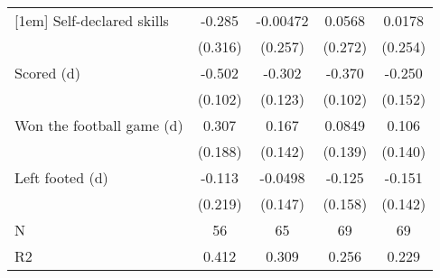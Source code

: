 {\begin{tabular}{l*{4}{c}}
[1em]
Self-declared skills&      -0.285         &    -0.00472         &      0.0568         &      0.0178         \\
                    &     (0.316)         &     (0.257)         &     (0.272)         &     (0.254)         \\
[1em]
Scored (d)          &      -0.502\sym{***}&      -0.302\sym{**} &      -0.370\sym{***}&      -0.250         \\
                    &     (0.102)         &     (0.123)         &     (0.102)         &     (0.152)         \\
[1em]
Won the football game (d)&       0.307         &       0.167         &      0.0849         &       0.106         \\
                    &     (0.188)         &     (0.142)         &     (0.139)         &     (0.140)         \\
[1em]
Left footed (d)     &      -0.113         &     -0.0498         &      -0.125         &      -0.151         \\
                    &     (0.219)         &     (0.147)         &     (0.158)         &     (0.142)         \\
\hline
N                   &          56         &          65         &          69         &          69         \\
R2                  &       0.412         &       0.309         &       0.256         &       0.229         \\
\hline\hline
\end{tabular}
}
